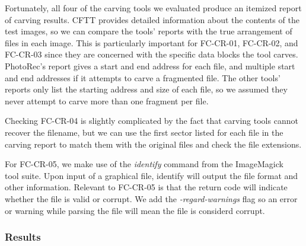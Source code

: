 Fortunately, all four of the carving tools we evaluated produce an itemized report of carving results. CFTT provides detailed information about the contents of the test images, so we can compare the tools' reports with the true arrangement of files in each image. This is particularly important for FC-CR-01, FC-CR-02, and FC-CR-03 since they are concerned with the specific data blocks the tool carves. PhotoRec's report gives a start and end address for each file, and multiple start and end addresses if it attempts to carve a fragmented file. The other tools' reports only list the starting address and size of each file, so we assumed they never attempt to carve more than one fragment per file.

Checking FC-CR-04 is slightly complicated by the fact that carving tools cannot recover the filename, but we can use the first sector listed for each file in the carving report to match them with the original files and check the file extensions.

For FC-CR-05, we make use of the \emph{identify} command from the ImageMagick~\cite{imagemagick} tool suite. Upon input of a graphical file, identify will output the file format and other information. Relevant to FC-CR-05 is that the return code will indicate whether the file is valid or corrupt. We add the \emph{-regard-warnings} flag so an error or warning while parsing the file will mean the file is considerd corrupt.

\subsubsection{Results}

